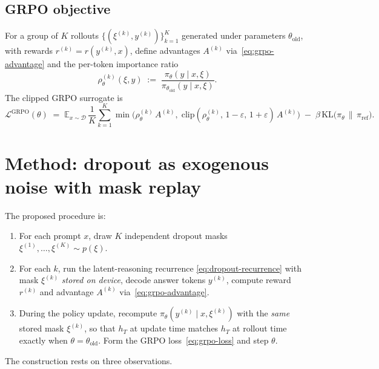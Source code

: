 \documentclass[11pt]{article}
\theoremstyle{definition}
\theoremstyle{remark}
\newcommand{\E}{\mathbb{E}}
\newcommand{\KL}{\mathrm{KL}}
\newcommand{\D}{\mathcal{D}}
\newcommand{\Loss}{\mathcal{L}}
\newcommand{\eps}{\varepsilon}
\newcommand{\old}{\mathrm{old}}
\begin{document}
\subsection{GRPO objective}

For a group of $K$ rollouts $\{(\xi^{(k)}, y^{(k)})\}_{k=1}^K$ generated under
parameters $\theta_\old$, with rewards $r^{(k)} = r(y^{(k)}, x)$, define
advantages $A^{(k)}$ via~\eqref{eq:grpo-advantage} and the per-token
importance ratio
\begin{equation}
\rho_\theta^{(k)}(\xi, y)
  \;:=\;
\frac{\pi_\theta(y \mid x, \xi)}{\pi_{\theta_\old}(y \mid x, \xi)}.
\end{equation}
The clipped GRPO surrogate is
\begin{equation}
\Loss^{\mathrm{GRPO}}(\theta)
  \;=\;
\E_{x \sim \D}\,
\frac{1}{K}\sum_{k=1}^{K}
  \min\!\Big(
    \rho_\theta^{(k)}\, A^{(k)}, \;
    \mathrm{clip}(\rho_\theta^{(k)},\,1-\eps,\,1+\eps)\,A^{(k)}
  \Big)
  \;-\;\beta\,\KL\!\big(\pi_{\theta}\,\big\|\,\pi_{\mathrm{ref}}\big).
\label{eq:grpo-loss}
\end{equation}

\section{Method: dropout as exogenous noise with mask replay}

The proposed procedure is:
\begin{enumerate}[topsep=2pt,itemsep=2pt]
\item For each prompt $x$, draw $K$ independent dropout masks
      $\xi^{(1)}, \dots, \xi^{(K)} \sim p(\xi)$.
\item For each $k$, run the latent-reasoning recurrence
      \eqref{eq:dropout-recurrence} with mask $\xi^{(k)}$ \emph{stored on
      device}, decode answer tokens $y^{(k)}$, compute reward $r^{(k)}$ and
      advantage $A^{(k)}$ via~\eqref{eq:grpo-advantage}.
\item During the policy update, recompute $\pi_\theta(y^{(k)}\mid x,\xi^{(k)})$
      with the \emph{same} stored mask $\xi^{(k)}$, so that $h_T$ at update
      time matches $h_T$ at rollout time exactly when $\theta = \theta_\old$.
      Form the GRPO loss~\eqref{eq:grpo-loss} and step $\theta$.
\end{enumerate}

The construction rests on three observations.
\end{document}
